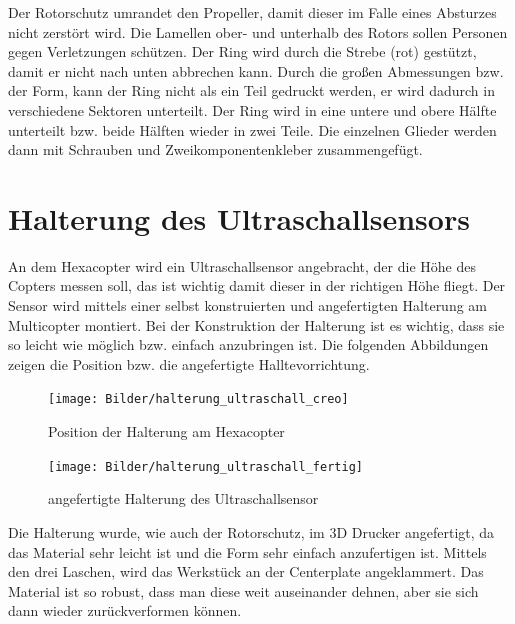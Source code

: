 Der Rotorschutz umrandet den Propeller, damit dieser im Falle eines Absturzes nicht zerstört wird. Die Lamellen ober- und unterhalb des Rotors sollen Personen gegen Verletzungen schützen. 
Der Ring wird durch die Strebe (rot) gestützt, damit er nicht nach unten abbrechen kann. 
Durch die großen Abmessungen bzw. der Form, kann der Ring nicht als ein Teil gedruckt werden, er wird dadurch in verschiedene Sektoren unterteilt. Der Ring wird in eine untere und obere Hälfte unterteilt bzw. beide Hälften wieder in zwei Teile. Die einzelnen Glieder werden dann mit Schrauben und Zweikomponentenkleber zusammengefügt. 

\section{Halterung des Ultraschallsensors}
An dem Hexacopter wird ein Ultraschallsensor angebracht, der die Höhe des Copters messen soll, das ist wichtig damit dieser in der richtigen Höhe fliegt. Der Sensor wird mittels einer selbst konstruierten und angefertigten Halterung am Multicopter montiert.
Bei der Konstruktion der Halterung ist es wichtig, dass sie so leicht wie möglich bzw. einfach anzubringen ist. Die folgenden Abbildungen zeigen die Position bzw. die angefertigte Halltevorrichtung.

\begin{figure}[htb]
\begin{centering}
\texttt{[image: Bilder/halterung\_ultraschall\_creo]}
\par\end{centering}
\caption{Position der Halterung am Hexacopter}
\label{Halterung des Ultraschallsensor}
\end{figure}

\begin{figure}[htb]
\begin{centering}
\texttt{[image: Bilder/halterung\_ultraschall\_fertig]}
\par\end{centering}
\caption{angefertigte Halterung des Ultraschallsensor}
\label{Halterung des Ultraschallsensor}
\end{figure}

Die Halterung wurde, wie auch der Rotorschutz, im 3D Drucker angefertigt, da das Material sehr leicht ist und die Form sehr einfach anzufertigen ist. Mittels den drei Laschen, wird das Werkstück an der Centerplate angeklammert.
Das Material ist so robust, dass man diese weit auseinander dehnen, aber sie sich dann wieder zurückverformen können. 
